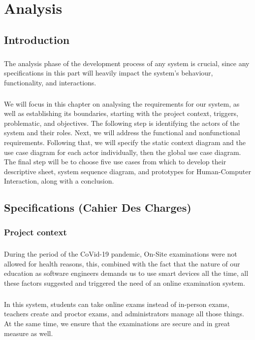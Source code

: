 \documentclass[]{uc2pfecaneva}
\title{}
\author{}
\begin{document}
    \setlength{\parskip}{6pts}

    \tableofcontents
    \listoffigures
    \listoftables
    \chapter{Analysis}

    \newpage

    \raggedright\section{Introduction}
    \justifying\paragraph{}
    The analysis phase of the development process of any system is crucial, since any specifications in this part will heavily impact the system's behaviour, functionality, and interactions.
    \justifying\paragraph{}
    We will focus in this chapter on analysing the requirements for our system, as well as establishing its boundaries, starting with the project context, triggers, problematic, and objectives. The following step is identifying the actors of the system and their roles. Next, we will address the functional and nonfunctional requirements. Following that, we will specify the static context diagram and the use case diagram for each actor individually, then the global use case diagram. The final step will be to choose five use cases from which to develop their descriptive sheet, system sequence diagram, and prototypes for Human-Computer Interaction, along with a conclusion.

    \raggedright\section{Specifications (Cahier Des Charges)}
    \subsection{Project context}
    \justifying\paragraph{}
    During the period of the CoVid-19 pandemic, On-Site examinations were not allowed for health reasons, this, combined with the fact that the nature of our education as software engineers demands us to use smart devices all the time, all these factors suggested and triggered the need of an online examination system.
    \justifying\paragraph{}
    In this system, students can take online exams instead of in-person exams, teachers create and proctor exams, and administrators manage all those things. At the same time, we ensure that the examinations are secure and in great measure as well.
\end{document}
